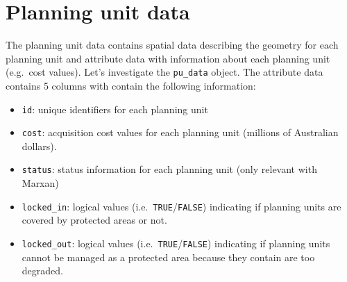 \documentclass[
  12pt,
]{book}
\newenvironment{Shaded}{\begin{snugshade}}{\end{snugshade}}
\newcommand{\CommentTok}[1]{\textcolor[rgb]{0.56,0.35,0.01}{\textit{#1}}}
\newcommand{\KeywordTok}[1]{\textcolor[rgb]{0.13,0.29,0.53}{\textbf{#1}}}
\newcommand{\NormalTok}[1]{#1}
\newcommand{\OperatorTok}[1]{\textcolor[rgb]{0.81,0.36,0.00}{\textbf{#1}}}
\newcommand{\StringTok}[1]{\textcolor[rgb]{0.31,0.60,0.02}{#1}}
\providecommand{\tightlist}{%
  \setlength{\itemsep}{0pt}\setlength{\parskip}{0pt}}
\begin{document}
\begin{Shaded}
\end{Shaded}

\clearpage

\hypertarget{planning-unit-data}{%
\section{Planning unit data}\label{planning-unit-data}}

The planning unit data contains spatial data describing the geometry for each planning unit and attribute data with information about each planning unit (e.g.~cost values). Let's investigate the \texttt{pu\_data} object. The attribute data contains 5 columns with contain the following information:

\begin{itemize}
\tightlist
\item
  \texttt{id}: unique identifiers for each planning unit
\item
  \texttt{cost}: acquisition cost values for each planning unit (millions of Australian dollars).
\item
  \texttt{status}: status information for each planning unit (only relevant with Marxan)
\item
  \texttt{locked\_in}: logical values (i.e.~\texttt{TRUE}/\texttt{FALSE}) indicating if planning units are covered by protected areas or not.
\item
  \texttt{locked\_out}: logical values (i.e.~\texttt{TRUE}/\texttt{FALSE}) indicating if planning units cannot be managed as a protected area because they contain are too degraded.
\end{itemize}
\end{document}
